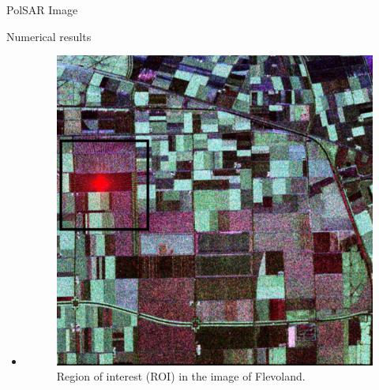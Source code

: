 \documentclass[10pt]{beamer}
\begin{document}
\begin{frame}[fragile]{PolSAR Image}
\begin{alertblock}{Numerical results}
\begin{itemize}
	\item 
	\begin{figure}[hbt]
\centering
	\includegraphics[width=.5\linewidth]{flevoland_radial_4_look_black}
	\caption{Region of interest (ROI) in the image of Flevoland.}
\label{flevoland_radial_4look}
\end{figure}
\end{itemize}
\end{alertblock}
\end{frame}
\end{document}
